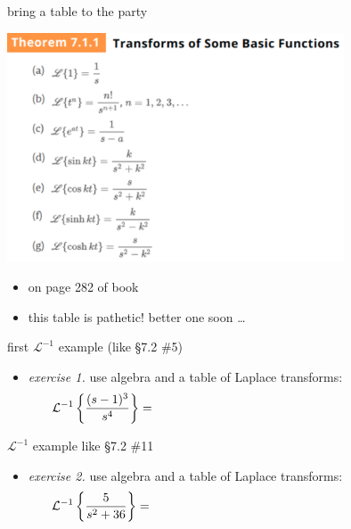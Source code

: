 \documentclass[dvipsnames,colorlinks]{beamer}
\begin{document}
\begin{frame}{bring a table to the party}

\begin{center}
\includegraphics[width=0.75\textwidth]{figs/laplacetable.pdf}
\end{center}

\begin{itemize}
\item on page 282 of book
\item this table is pathetic!  better one soon \dots
\end{itemize}
\end{frame}


\begin{frame}{first $\mathcal{L}^{-1}$ example (like \S7.2 \#5)}

\begin{itemize}
\item \emph{exercise 1.}  use algebra and a table of Laplace transforms:
    $$\LLi{\frac{(s-1)^3}{s^4}} = \hspace{80mm}$$
\end{itemize}

\vspace{50mm}
\end{frame}


\begin{frame}{$\mathcal{L}^{-1}$ example like \S7.2 \#11}

\begin{itemize}
\item \emph{exercise 2.}  use algebra and a table of Laplace transforms:
    $$\LLi{\frac{5}{s^2+36}} = \hspace{80mm}$$
\end{itemize}

\vspace{50mm}
\end{frame}
\end{document}
